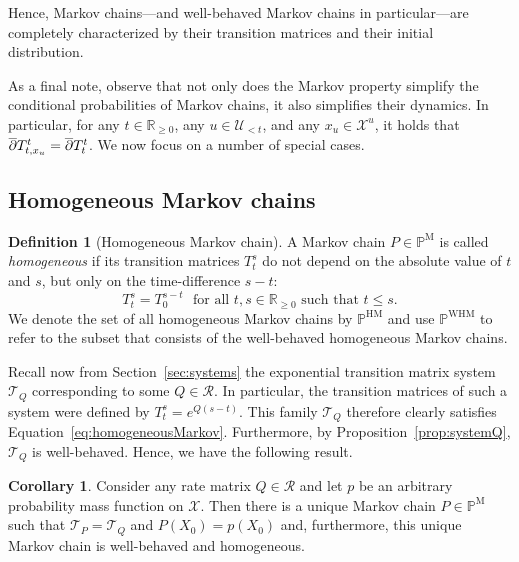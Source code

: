 \documentclass[10pt,a4paper]{paper}
\theoremstyle{definition}
\newtheorem{corollary}[theorem]{Corollary}
\newtheorem{definition}{Definition}
\newcommand{\reals}{\mathbb{R}}
\newcommand{\realsnonneg}{\reals_{\geq 0}}
\newcommand{\states}{\mathcal{X}}
\newcommand{\processes}{\mathbb{P}}
\newcommand{\mprocesses}{\processes^{\mathrm{M}}}
\newcommand{\hmprocesses}{\processes^{\mathrm{HM}}}
\newcommand{\whmprocesses}{\processes^{\mathrm{WHM}}}
\begin{document}
Hence, Markov chains---and well-behaved Markov chains in particular---are completely characterized by their transition matrices and their initial distribution. 

As a final note, observe that not only does the Markov property simplify the conditional probabilities of Markov chains, it also simplifies their dynamics. In particular, for any $t\in\realsnonneg$, any $u\in\mathcal{U}_{<t}$, and any $x_u\in\states^u$, it holds that $\smash{\overline{\partial}}T_{t,x_u}^t=\smash{\overline{\partial}}T_{t}^t$. We now focus on a number of special cases.

\subsection{Homogeneous Markov chains}\label{sec:homogen_markov_chain}

\begin{definition}[Homogeneous Markov chain]\label{def:homogeneousMarkov}
A Markov chain $P\in\mprocesses$ is called \emph{homogeneous} if its transition matrices $T_t^s$ do not depend on the absolute value of $t$ and $s$, but only on the time-difference $s-t$:
\begin{equation}\label{eq:homogeneousMarkov}
T_t^s=T_0^{s-t}
\text{~~for all $t,s\in\realsnonneg$ such that $t\leq s$.}
\end{equation}
We denote the set of all homogeneous Markov chains by $\hmprocesses$ and use $\whmprocesses$ to refer to the subset that consists of the well-behaved homogeneous Markov chains.
\end{definition}

Recall now from Section~\ref{sec:systems} the exponential transition matrix system $\mathcal{T}_Q$ corresponding to some $Q\in\mathcal{R}$. In particular, the transition matrices of such a system were defined by $T_t^s = e^{Q(s-t)}$. This family $\mathcal{T}_Q$ therefore clearly satisfies Equation~\ref{eq:homogeneousMarkov}. Furthermore, by Proposition~\ref{prop:systemQ}, $\mathcal{T}_Q$ is well-behaved. Hence, we have the following result.

\begin{corollary}\label{cor:rate_has_unique_homogen_markov_process}
Consider any rate matrix $Q\in\mathcal{R}$ and let $p$ be an arbitrary probability mass function on $\states$. Then there is a unique Markov chain $P\in\mprocesses$ such that $\mathcal{T}_P=\mathcal{T}_Q$ and $P(X_0)=p(X_0)$ and, furthermore, this unique Markov chain is well-behaved and homogeneous.
\end{corollary}
\end{document}
